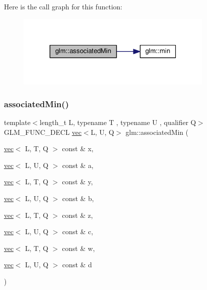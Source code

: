 Here is the call graph for this function\+:
\nopagebreak
\begin{figure}[H]
\begin{center}
\leavevmode
\includegraphics[width=271pt]{d6/d10/group__gtx__associated__min__max_ga432224ebe2085eaa2b63a077ecbbbff6_cgraph}
\end{center}
\end{figure}
\mbox{\label{group__gtx__associated__min__max_ga66b08118bc88f0494bcacb7cdb940556}} 
\subsubsection{\texorpdfstring{associated\+Min()}{associatedMin()}\hspace{0.1cm}{\footnotesize\ttfamily [8/10]}}
{\footnotesize\ttfamily template$<$length\+\_\+t L, typename T , typename U , qualifier Q$>$ \\
G\+L\+M\+\_\+\+F\+U\+N\+C\+\_\+\+D\+E\+CL \hyperlink{structglm_1_1vec}{vec}$<$L, U, Q$>$ glm\+::associated\+Min (\begin{DoxyParamCaption}\item[{\hyperlink{structglm_1_1vec}{vec}$<$ L, T, Q $>$ const \&}]{x,  }\item[{\hyperlink{structglm_1_1vec}{vec}$<$ L, U, Q $>$ const \&}]{a,  }\item[{\hyperlink{structglm_1_1vec}{vec}$<$ L, T, Q $>$ const \&}]{y,  }\item[{\hyperlink{structglm_1_1vec}{vec}$<$ L, U, Q $>$ const \&}]{b,  }\item[{\hyperlink{structglm_1_1vec}{vec}$<$ L, T, Q $>$ const \&}]{z,  }\item[{\hyperlink{structglm_1_1vec}{vec}$<$ L, U, Q $>$ const \&}]{c,  }\item[{\hyperlink{structglm_1_1vec}{vec}$<$ L, T, Q $>$ const \&}]{w,  }\item[{\hyperlink{structglm_1_1vec}{vec}$<$ L, U, Q $>$ const \&}]{d }\end{DoxyParamCaption})}



